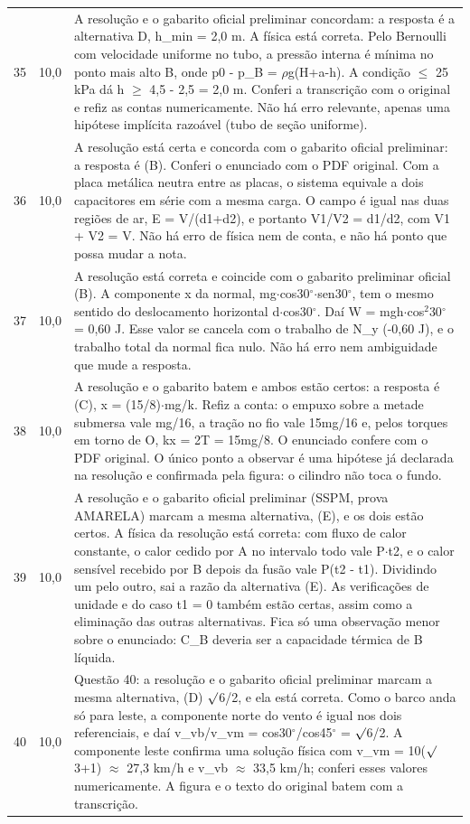 \documentclass{article}%
\begin{document}
\begin{longtable}{@{}c c p{}@{}}
35 & 10,0 & A resolução e o gabarito oficial preliminar concordam: a resposta é a alternativa D, h\_min = 2,0 m. A física está correta. Pelo Bernoulli com velocidade uniforme no tubo, a pressão interna é mínima no ponto mais alto B, onde p0 - p\_B = $\rho$g(H+a-h). A condição $\leq$ 25 kPa dá h $\geq$ 4,5 - 2,5 = 2,0 m. Conferi a transcrição com o original e refiz as contas numericamente. Não há erro relevante, apenas uma hipótese implícita razoável (tubo de seção uniforme). \\
36 & 10,0 & A resolução está certa e concorda com o gabarito oficial preliminar: a resposta é (B). Conferi o enunciado com o PDF original. Com a placa metálica neutra entre as placas, o sistema equivale a dois capacitores em série com a mesma carga. O campo é igual nas duas regiões de ar, E = V/(d1+d2), e portanto V1/V2 = d1/d2, com V1 + V2 = V. Não há erro de física nem de conta, e não há ponto que possa mudar a nota. \\
37 & 10,0 & A resolução está correta e coincide com o gabarito preliminar oficial (B). A componente x da normal, mg$\cdot$cos30$^\circ$$\cdot$sen30$^\circ$, tem o mesmo sentido do deslocamento horizontal d$\cdot$cos30$^\circ$. Daí W = mgh$\cdot$cos$^2$30$^\circ$ = 0,60 J. Esse valor se cancela com o trabalho de N\_y (-0,60 J), e o trabalho total da normal fica nulo. Não há erro nem ambiguidade que mude a resposta. \\
38 & 10,0 & A resolução e o gabarito batem e ambos estão certos: a resposta é (C), x = (15/8)$\cdot$mg/k. Refiz a conta: o empuxo sobre a metade submersa vale mg/16, a tração no fio vale 15mg/16 e, pelos torques em torno de O, kx = 2T = 15mg/8. O enunciado confere com o PDF original. O único ponto a observar é uma hipótese já declarada na resolução e confirmada pela figura: o cilindro não toca o fundo. \\
39 & 10,0 & A resolução e o gabarito oficial preliminar (SSPM, prova AMARELA) marcam a mesma alternativa, (E), e os dois estão certos. A física da resolução está correta: com fluxo de calor constante, o calor cedido por A no intervalo todo vale P$\cdot$t2, e o calor sensível recebido por B depois da fusão vale P(t2 - t1). Dividindo um pelo outro, sai a razão da alternativa (E). As verificações de unidade e do caso t1 = 0 também estão certas, assim como a eliminação das outras alternativas. Fica só uma observação menor sobre o enunciado: C\_B deveria ser a capacidade térmica de B líquida. \\
40 & 10,0 & Questão 40: a resolução e o gabarito oficial preliminar marcam a mesma alternativa, (D) $\surd$6/2, e ela está correta. Como o barco anda só para leste, a componente norte do vento é igual nos dois referenciais, e daí v\_vb/v\_vm = cos30$^\circ$/cos45$^\circ$ = $\surd$6/2. A componente leste confirma uma solução física com v\_vm = 10($\surd$3+1) $\approx$ 27,3 km/h e v\_vb $\approx$ 33,5 km/h; conferi esses valores numericamente. A figura e o texto do original batem com a transcrição. \\
\bottomrule\end{longtable}%
\end{document}
